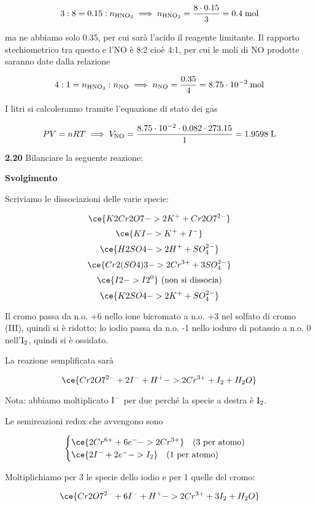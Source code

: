 $$3:8=0.15:n_{\rm HNO_3}
\implies
n_{\rm HNO_3}=\frac{8 \cdot 0.15}{3}=0.4 \; \rm mol$$

ma ne abbiamo solo 0.35, per cui sarà l'acido il reagente limitante. Il rapporto stechiometrico tra questo e l'NO è 8:2 cioè 4:1, per cui le moli di NO prodotte saranno date dalla relazione

$$4:1=n_{\rm HNO_3}:n_{\rm NO}
\implies
n_{\rm NO}=\frac{0.35}{4}=8.75 \cdot 10^{-2} \; \rm mol$$

I litri si calcoleranno tramite l'equazione di stato dei gas

$$PV=nRT \implies V_{\rm NO}=\frac{8.75 \cdot 10^{-2} \cdot 0.082 \cdot 273.15}{1}=1.9598 \; \rm L$$

\textbf{2.20} Bilanciare la seguente reazione:

\begin{center}
\end{center}

\large\textbf{Svolgimento}\normalsize

\vspace{0.2cm}Scriviamo le dissociazioni delle varie specie:

$$\ce{K2Cr2O7 -> 2K^+ + Cr2O7^{2-}}$$
$$\ce{KI -> K^+ + I^-}$$
$$\ce{H2SO4 -> 2H^+ + SO_4^{2-}}$$
$$\ce{Cr2(SO4)3 -> 2Cr^{3+} + 3SO_4^{2-}}$$
$$\ce{I2 -> I2^{0}} \text{ (non si dissocia)}$$
$$\ce{K2SO4 -> 2K^+ + SO_4^{2-}}$$

Il cromo passa da n.o. +6 nello ione bicromato a n.o. +3 nel solfato di cromo (III), quindi si è ridotto; lo iodio passa da n.o. -1 nello ioduro di potassio a n.o. 0 nell'$\rm I_2$, quindi si è ossidato.

La reazione semplificata sarà

$$\ce{Cr2O7^{2-} + 2I^- + H^+ -> 2Cr^{3+} + I_2 + H_2O}$$

Nota: abbiamo moltiplicato $\rm I^-$ per due perché la specie a destra è $\rm I_2$.

Le semireazioni redox che avvengono sono

$$\begin{cases}
    \ce{2Cr^{6+} + 6e^- -> 2Cr^{3+}} \quad (\text{3 per atomo})\\
    \ce{2I^- + 2e^- -> I_2} \quad (\text{1 per atomo})
\end{cases}$$

Moltiplichiamo per 3 le specie dello iodio e per 1 quelle del cromo:

$$\ce{Cr2O7^{2-} + 6I^- + H^+ -> 2Cr^{3+} + 3I_2 + H_2O}$$


